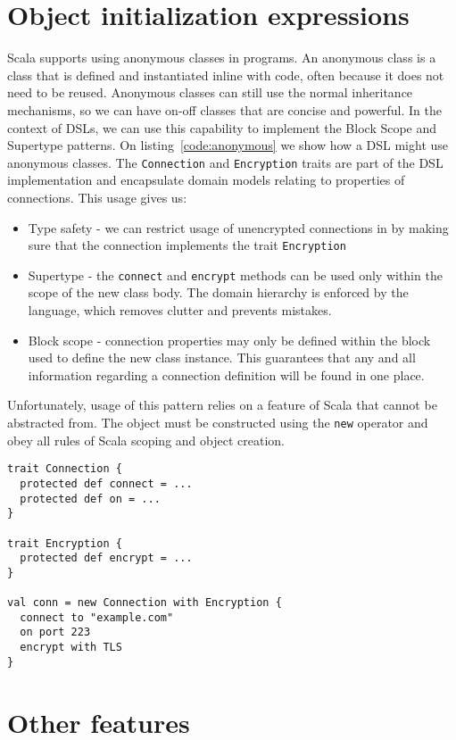 \section{Object initialization expressions}

Scala supports using anonymous classes in programs. An anonymous class is a class that is defined and instantiated inline with code, often because it does not need to be reused. Anonymous classes can still use the normal inheritance mechanisms, so we can have on-off classes that are concise and powerful. In the context of DSLs, we can use this capability to implement the Block Scope and Supertype patterns. On listing~\ref{code:anonymous} we show how a DSL might use anonymous classes. The \texttt{Connection} and \texttt{Encryption} traits are part of the DSL implementation and encapsulate domain models relating to properties of connections. This usage gives us:
\begin{itemize}
	\item Type safety - we can restrict usage of unencrypted connections in by making sure that the connection implements the trait \texttt{Encryption}
	\item Supertype - the \texttt{connect} and \texttt{encrypt} methods can be used only within the scope of the new class body. The domain hierarchy is enforced by the language, which removes clutter and prevents mistakes.
	\item Block scope - connection properties may only be defined within the block used to define the new class instance. This guarantees that any and all information regarding a connection definition will be found in one place.
\end{itemize}

Unfortunately, usage of this pattern relies on a feature of Scala that cannot be abstracted from. The object must be constructed using the \texttt{new} operator and obey all rules of Scala scoping and object creation.

\begin{lstlisting}[caption=Anonymous classes, label=code:anonymous]
trait Connection {
  protected def connect = ...
  protected def on = ...
}

trait Encryption {
  protected def encrypt = ...
}

val conn = new Connection with Encryption {
  connect to "example.com"
  on port 223
  encrypt with TLS
}
\end{lstlisting}

\section{Other features}

